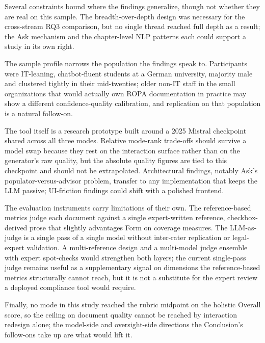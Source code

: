 Several constraints bound where the findings generalize, though
not whether they are real on this sample. The breadth-over-depth
design was necessary for the cross-stream RQ3 comparison, but no
single thread reached full depth as a result; the Ask mechanism
and the chapter-level NLP patterns each could support a study in
its own right.

The sample profile narrows the population the findings speak to.
Participants were IT-leaning, chatbot-fluent students at a
German university, majority male and clustered tightly in their
mid-twenties; older non-IT staff in the small organizations that
would actually own ROPA documentation in practice may show a
different confidence-quality calibration, and replication on
that population is a natural follow-on.

The tool itself is a research prototype built around a 2025
Mistral checkpoint shared across all three modes. Relative
mode-rank trade-offs should survive a model swap because they
rest on the interaction surface rather than on the generator's
raw quality, but the absolute quality figures are tied to this
checkpoint and should not be extrapolated. Architectural
findings, notably Ask's populator-versus-advisor problem,
transfer to any implementation that keeps the LLM passive;
UI-friction findings could shift with a polished frontend.

The evaluation instruments carry limitations of their own. The
reference-based metrics judge each document against a single
expert-written reference, checkbox-derived prose that slightly
advantages Form on coverage measures. The LLM-as-judge is a
single pass of a single model without inter-rater replication or
legal-expert validation. A multi-reference design and a
multi-model judge ensemble with expert spot-checks would
strengthen both layers; the current single-pass judge remains
useful as a supplementary signal on dimensions the
reference-based metrics structurally cannot reach, but it is not
a substitute for the expert review a deployed compliance tool
would require.

Finally, no mode in this study reached the rubric midpoint on
the holistic Overall score, so the ceiling on document quality
cannot be reached by interaction redesign alone; the model-side
and oversight-side directions the Conclusion's follow-ons take
up are what would lift it.